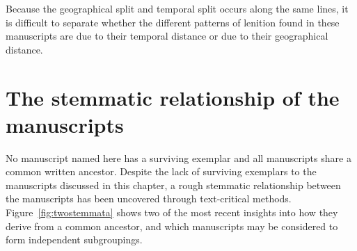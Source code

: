 Because the geographical split and temporal split occurs along the same lines, it is difficult to separate whether the different patterns of lenition found in these manuscripts are due to their temporal distance or due to their geographical distance.



\section{The stemmatic relationship of the manuscripts}
\label{sec:stemmata}
No manuscript named here has a surviving exemplar and all manuscripts share a common written ancestor. Despite the lack of surviving exemplars to the manuscripts discussed in this chapter, a rough stemmatic relationship between the manuscripts has been uncovered through text-critical methods. Figure~\ref{fig:twostemmata} shows two of the most recent insights into how they derive from a common ancestor, and which manuscripts may be considered to form independent subgroupings.

